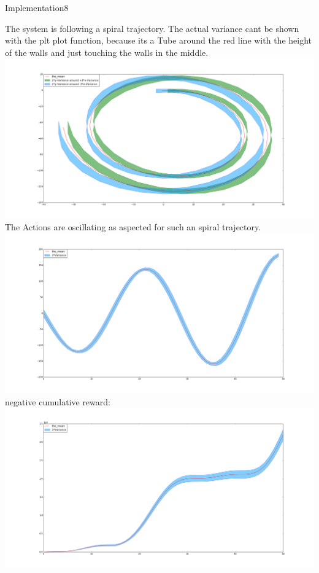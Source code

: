 \begin{questions}
\begin{question}{Implementation}{8}
\begin{answer}
The system is following a spiral trajectory. The actual variance cant be shown with the plt plot function, because its a Tube around the red line with the height of the walls and just touching the walls in the middle.\\
\includegraphics[scale=0.35,trim=70mm 0mm 0mm 0mm,clip=true]{states_a.png}
The Actions are oscillating as aspected for such an spiral trajectory.\\
\includegraphics[scale=0.35,trim=70mm 0mm 0mm 0mm,clip=true]{actions_a.png}
\newpage
negative cumulative reward:\\
\includegraphics[scale=0.35,trim=70mm 0mm 0mm 0mm,clip=true]{rewards_a.png}
\newpage

\end{answer}



\end{question}
\end{questions}
